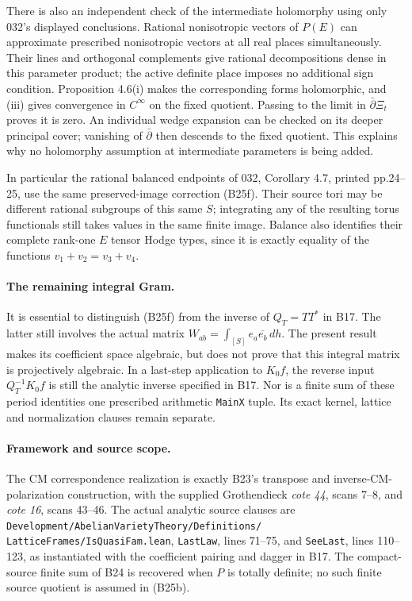 There is also an independent check of the
intermediate holomorphy using only 032's
displayed conclusions.  Rational nonisotropic
vectors of $P(E)$ can approximate prescribed
nonisotropic vectors at all real places
simultaneously.  Their lines and orthogonal
complements give rational decompositions
dense in this parameter product; the active
definite place imposes no additional sign
condition.  Proposition 4.6(i) makes the
corresponding forms holomorphic, and (iii)
gives convergence in $C^\infty$ on the fixed
quotient.  Passing to the limit in
$\bar\partial\Xi_t$ proves it is zero.
An individual wedge expansion can be checked
on its deeper principal cover; vanishing of
$\bar\partial$ then descends to the fixed
quotient.  This explains why no holomorphy
assumption at intermediate parameters is
being added.

In particular the rational balanced
endpoints of 032, Corollary 4.7, printed
pp.24--25, use the same preserved-image
correction (B25f).  Their source tori may
be different rational subgroups of this
same $S$; integrating any of the resulting
torus functionals still takes values in
the same finite image.
Balance also identifies their complete
rank-one $E$ tensor Hodge types, since it
is exactly equality of the functions
$v_1+v_2=v_3+v_4$.

\paragraph{The remaining integral Gram.}
It is essential to distinguish (B25f) from
the inverse of $Q_T=TT^*$ in B17.
The latter still involves the actual matrix
$W_{ab}=\int_{[S]}e_a\overline{e_b}\,dh$.
The present result makes its coefficient
space algebraic, but does not prove that
this integral matrix is projectively algebraic.
In a last-step application to $K_0f$, the
reverse input $Q_T^{-1}K_0f$ is still the
analytic inverse specified in B17.
Nor is a finite sum of these period identities
one prescribed arithmetic \texttt{MainX}
tuple.  Its exact kernel, lattice and
normalization clauses remain separate.

\paragraph{Framework and source scope.}
The CM correspondence realization is exactly
B23's transpose and inverse-CM-polarization
construction, with the supplied Grothendieck
\emph{cote 44}, scans 7--8, and
\emph{cote 16}, scans 43--46.
The actual analytic source clauses are
\texttt{Development/AbelianVarietyTheory/Definitions/}
\texttt{LatticeFrames/IsQuasiFam.lean},
\texttt{LastLaw}, lines 71--75, and
\texttt{SeeLast}, lines 110--123, as
instantiated with the coefficient pairing
and dagger in B17.  The compact-source
finite sum of B24 is recovered when
$P$ is totally definite; no such finite
source quotient is assumed in (B25b).
